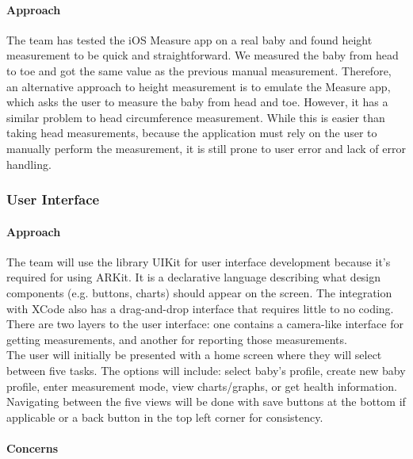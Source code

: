 \documentclass[onecolumn, draftclsnofoot,10pt, compsoc]{IEEEtran}
\begin{document}
\paragraph{Approach}

The team has tested the iOS Measure app on a real baby and found height measurement to be quick and straightforward. We measured the baby from head to toe and got the same value as the previous manual measurement. Therefore, an alternative approach to height measurement is to emulate the Measure app, which asks the user to measure the baby from head and toe. However, it has a similar problem to head circumference measurement. While this is easier than taking head measurements, because the application must rely on the user to manually perform the measurement, it is still prone to user error and lack of error handling.

\subsubsection{User Interface}

\paragraph{Approach}

The team will use the library UIKit for user interface development because it's required for using ARKit. It is a declarative language describing what design components (e.g. buttons, charts) should appear on the screen. The integration with XCode also has a drag-and-drop interface that requires little to no coding.\\

There are two layers to the user interface: one contains a camera-like interface for getting measurements, and another for reporting those measurements.\\

The user will initially be presented with a home screen where they will select between five tasks. The options will include: select baby's profile, create new baby profile, enter measurement mode, view charts/graphs, or get health information. Navigating between the five views will be done with save buttons at the bottom if applicable or a back button in the top left corner for consistency.

\paragraph{Concerns}
\end{document}

